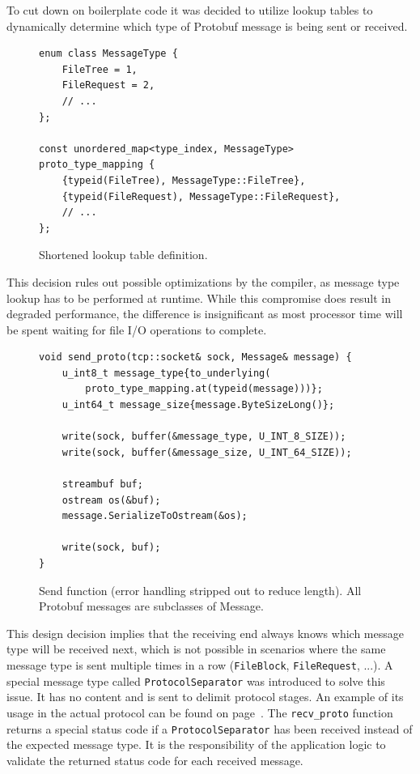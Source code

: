 \documentclass[a4paper]{article}
\begin{document}
To cut down on boilerplate code it was decided to utilize lookup tables to dynamically determine which type of Protobuf message is being sent or received. 

\begin{figure}[H]
\begin{verbatim}
enum class MessageType {
	FileTree = 1,
	FileRequest = 2,
	// ...
};

const unordered_map<type_index, MessageType> proto_type_mapping {
	{typeid(FileTree), MessageType::FileTree},
	{typeid(FileRequest), MessageType::FileRequest},
	// ...
};
\end{verbatim}
\caption{Shortened lookup table definition.}
\end{figure}

This decision rules out possible optimizations by the compiler, as message type lookup has to be performed at runtime. While this compromise does result in degraded performance, the difference is insignificant as most processor time will be spent waiting for file I/O operations to complete.

\begin{figure}[H]
\begin{verbatim}
void send_proto(tcp::socket& sock, Message& message) {
	u_int8_t message_type{to_underlying(
		proto_type_mapping.at(typeid(message)))};
	u_int64_t message_size{message.ByteSizeLong()};

	write(sock, buffer(&message_type, U_INT_8_SIZE));
	write(sock, buffer(&message_size, U_INT_64_SIZE));

	streambuf buf;
	ostream os(&buf);
	message.SerializeToOstream(&os);

	write(sock, buf);
}
\end{verbatim}
\caption{Send function (error handling stripped out to reduce length). All Protobuf messages are subclasses of Message.}
\end{figure}

This design decision implies that the receiving end always knows which message type will be received next, which is not possible in scenarios where the same message type is sent multiple times in a row (\texttt{FileBlock}, \texttt{FileRequest}, ...). A special message type called \texttt{ProtocolSeparator} was introduced to solve this issue. It has no content and is sent to delimit protocol stages.
\bigbreak
An example of its usage in the actual protocol can be found on page~\pageref{fig:stage2}.
\bigbreak
The \texttt{recv\_proto} function returns a special status code if a \texttt{ProtocolSeparator} has been received instead of the expected message type. It is the responsibility of the application logic to validate the returned status code for each received message.
\end{document}
